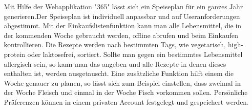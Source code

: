 Mit Hilfe der Webapplikation "365" lässt sich ein Speiseplan für ein ganzes Jahr generieren.Der Speiseplan ist individuell anpassbar und auf Useranforderungen abgestimmt. 
Mit der Einkaufslistenfunktion kann man alle Lebensmittel, die in der kommenden Woche gebraucht werden, offline abrufen und beim Einkaufen kontrollieren. Die Rezepte werden nach bestimmten Tags, wie vegetarisch, high-protein oder laktosefrei, sortiert. Sollte man gegen ein bestimmtes Lebensmittel allergisch sein, so kann man das angeben und alle Rezepte in denen dieses enthalten ist, werden ausgetauscht. Eine zusätzliche Funktion hilft einem die Woche genauer zu planen, so lässt sich zum Beispiel einstellen, dass zweimal in der Woche Fleisch und einmal in der Woche Fisch vorkommen sollen. Persönliche Präferenzen können in einem privaten Account festgelegt und gespeichert werden.